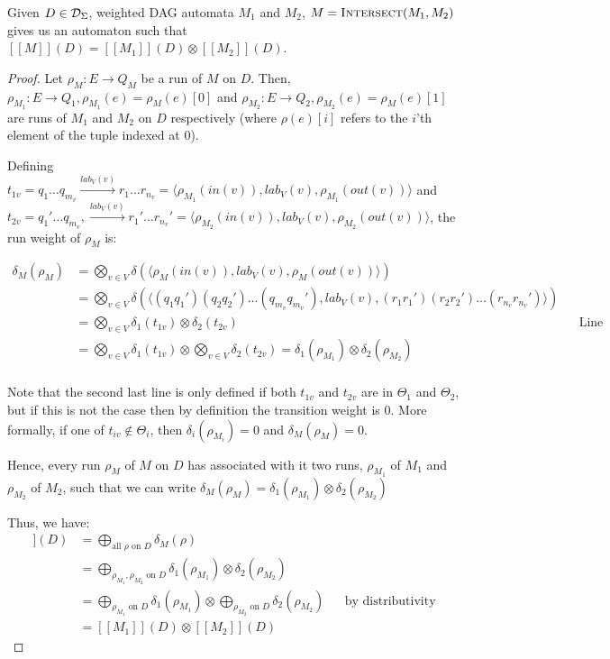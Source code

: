 \documentclass[11pt]{article}
\begin{document}
\begin{theorem}
    Given $D \in \mathcal{D}_\Sigma$, weighted DAG automata $M_1$ and $M_2$, $M =
    \textsc{Intersect}(M_1, M_2)$ gives us an automaton such that $[[M]](D) =
    [[M_1]](D) \otimes [[M_2]](D)$.
\end{theorem}
\begin{proof}
Let $\rho_M: E \rightarrow Q_M$ be a run of $M$ on $D$. Then, $\rho_{M_1}: E
\rightarrow Q_1, \rho_{M_1}(e) = \rho_M(e)[0]$ and $\rho_{M_2}: E \rightarrow
Q_2, \rho_{M_2}(e) = \rho_M(e)[1]$ are runs of $M_1$ and $M_2$ on $D$
respectively (where $\rho(e)[i]$ refers to the $i$'th element of the tuple
indexed at 0). 

Defining $t_{1v} =  q_1\ldots q_{m_v} \xrightarrow{lab_V(v)}
r_1\ldots r_{n_v} = \langle \rho_{M_1}(in(v)), lab_V(v),
\rho_{M_1}(out(v)) \rangle$ and $t_{2v} =  q_1'\ldots q_{m_v},
\xrightarrow{lab_V(v)} r_1'\ldots r_{n_v}'  = \langle \rho_{M_2}(in(v)),
lab_V(v), \rho_{M_2}(out(v)) \rangle$, the run weight of $\rho_M$ is:

\begin{align*}
  \delta_M(\rho_M) &= \bigotimes_{v \in V} \delta(\langle \rho_M(in(v)), lab_V(v), \rho_M(out(v))\rangle)\\
  &= \bigotimes_{v \in V} \delta(\langle (q_1q_1')(q_2q_2') \ldots (q_{m_v}q_{m_v}'), lab_V(v), (r_1r_1')(r_2r_2') \ldots (r_{n_v}r_{n_v}')\rangle)\\
  &= \bigotimes_{v \in V} \delta_1(t_{1v}) \otimes \delta_2(t_{2v}) &&\text{Line 9}\\
  &= \bigotimes_{v \in V} \delta_1(t_{1v}) \otimes \bigotimes_{v \in V} \delta_2(t_{2v}) = \delta_1(\rho_{M_1}) \otimes \delta_2(\rho_{M_2})\\
\end{align*}

Note that the second last line is only defined if both $t_{1v}$ and $t_{2v}$ are
in $\Theta_1$ and $\Theta_2$, but if this is not the case then by definition the
transition weight is 0. More formally, if one of $t_{iv} \notin \Theta_i$, then
$\delta_i(\rho_{M_i}) =0$ and $\delta_M(\rho_M) = 0$.

Hence, every run $\rho_M$ of $M$ on $D$ has associated with it two runs,
$\rho_{M_1}$ of $M_1$ and $\rho_{M_2}$ of $M_2$, such that we can write
$\delta_M(\rho_M) = \delta_1(\rho_{M_1}) \otimes \delta_2(\rho_{M_2})$ 

Thus, we have:
\begin{align*}
  [[M]](D) &= \bigoplus_{\text{all $\rho$ on $D$}} \delta_M(\rho)\\
  &= \bigoplus_{\rho_{M_1}, \rho_{M_2} \text{ on $D$}} \delta_1(\rho_{M_1}) \otimes \delta_2(\rho_{M_2})\\
  &= \bigoplus_{\rho_{M_1} \text{ on $D$}} \delta_1(\rho_{M_1}) \otimes \bigoplus_{\rho_{M_2} \text{ on $D$}} \delta_2(\rho_{M_2}) &&\text{by distributivity}\\
  &= [[M_1]](D) \otimes [[M_2]](D)
\end{align*}
\end{proof}
\end{document}

